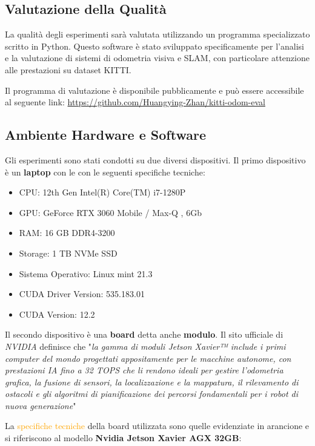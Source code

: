 \documentclass[12pt,a4paper]{report}
\begin{document}
\subsection{Valutazione della Qualità}

La qualità degli esperimenti sarà valutata utilizzando un programma specializzato scritto in Python. Questo software è stato sviluppato specificamente per l'analisi e la valutazione di sistemi di odometria visiva e SLAM, con particolare attenzione alle prestazioni su dataset KITTI.

Il programma di valutazione è disponibile pubblicamente e può essere accessibile al seguente link:
\url{https://github.com/Huangying-Zhan/kitti-odom-eval}

\subsection{Ambiente Hardware e Software}

Gli esperimenti sono stati condotti su due diversi dispositivi.
Il primo dispositivo è un \textbf{laptop} con le con le seguenti specifiche tecniche:

\begin{itemize}
    \item CPU: 12th Gen Intel(R) Core(TM) i7-1280P
    \item GPU: GeForce RTX 3060 Mobile / Max-Q , 6Gb
    \item RAM: 16 GB DDR4-3200
    \item Storage: 1 TB NVMe SSD
    \item Sistema Operativo: Linux mint 21.3
    \item CUDA Driver Version: 535.183.01  
    \item CUDA Version: 12.2
\end{itemize}

\vspace{1cm}

Il secondo dispositivo è una \textbf{board} detta anche \textbf{modulo}.
Il sito ufficiale di \textit{NVIDIA} definisce che "\textit{la gamma di moduli Jetson Xavier™ include i primi computer del mondo progettati appositamente per le macchine autonome, con prestazioni IA fino a 32 TOPS che li rendono ideali per gestire l'odometria grafica, la fusione di sensori, la localizzazione e la mappatura, il rilevamento di ostacoli e gli algoritmi di pianificazione dei percorsi fondamentali per i robot di nuova generazione}" \cite{board-series}

La \textcolor{orange}{specifiche tecniche} della board utilizzata sono quelle evidenziate in arancione e si riferiscono al modello \textbf{Nvidia Jetson Xavier AGX 32GB}:
\end{document}
